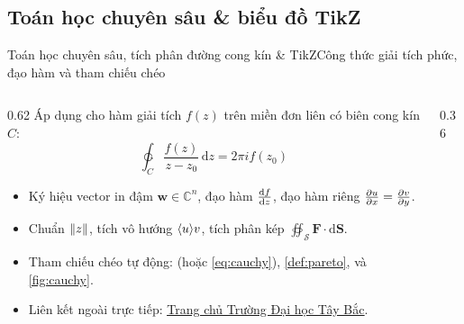 \documentclass[aspectratio=169,10pt]{beamer}
\begin{document}
\subsection{Toán học chuyên sâu \& biểu đồ TikZ}
\begin{frame}{Toán học chuyên sâu, tích phân đường cong kín \& TikZ}{Công thức giải tích phức, đạo hàm và tham chiếu chéo}
  \begin{columns}[c]
    \begin{column}{0.62\textwidth}
      Áp dụng cho hàm giải tích $f(z)$ trên miền đơn liên có biên cong kín $C$:
      \begin{equation}
        \ointctrclockwise_{C} \frac{f(z)}{z - z_0}\,\mathrm{d}z = 2\pi i f(z_0) \label{eq:cauchy}
      \end{equation}
      \begin{itemize}\setlength{\itemsep}{2pt}
        \item Ký hiệu vector in đậm $\bm{w} \in \mathbb{C}^n$, đạo hàm $\odv{f}{z}$, đạo hàm riêng $\pdv{u}{x} = \pdv{v}{y}$.
        \item Chuẩn $\lVert z\rVert$, tích vô hướng $\langle u\rangle{v}$, tích phân kép $\oiint_{\mathcal{S}} \bm{F}\cdot\mathrm{d}\bm{S}$.
        \item Tham chiếu chéo tự động:  (hoặc \eqref{eq:cauchy}), \cref{def:pareto}, và \cref{fig:cauchy}.
        \item Liên kết ngoài trực tiếp: \href{https://utb.edu.vn}{\underline{Trang chủ Trường Đại học Tây Bắc}}.
      \end{itemize}
    \end{column}
    \begin{column}{0.36\textwidth}
      \centering
      \vskip 2pt
      \label{fig:cauchy}
    \end{column}
  \end{columns}
\end{frame}
\end{document}
